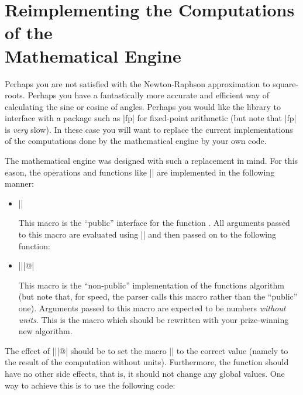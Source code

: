 %
%
%


\section[Reimplementing the Computations of the Mathematical Engine]
  {Reimplementing the Computations of the\\ Mathematical Engine}

\label{pgfmath-reimplement}

Perhaps you are not satisfied with the Newton-Raphson approximation to
square-roots. Perhaps you have a fantastically more accurate
and efficient way of calculating the sine or cosine of angles. Perhaps
 you would like the library to interface with a package such as |fp| 
 for fixed-point arithmetic (but note that |fp| is \emph{very} slow).
In these case you will want to replace the current implementations of
the computations done by the mathematical engine by your own code. 

The mathematical engine was designed with such a replacement in
mind. For this eason, the operations and functions like |\pgfmathadd|
are implemented in the following manner: 

\begin{itemize}
\item |\pgfmath| 

  This macro is the ``public'' interface for the function
  . All arguments passed to this macro are 
  evaluated using |\pgfmathparse| and then passed on to the following
  function:
  
\item |\pgfmath||@|
  
  This macro is the ``non-public'' implementation of the functions 
  algorithm (but note that, for speed, the parser calls this macro 
  rather than the ``public'' one). Arguments passed to this macro 
  are expected to be numbers \emph{without units}. This is the macro 
  which should be rewritten with your prize-winning new algorithm.
	
\end{itemize}

The effect of |\pgfmath||@| should be to set the
macro |\pgfmathresult| to the correct value (namely to the result of
the computation without units). Furthermore, the function should have
no other side effects, that is, it should not change any global
values. One way to achieve this is to use the following code:

